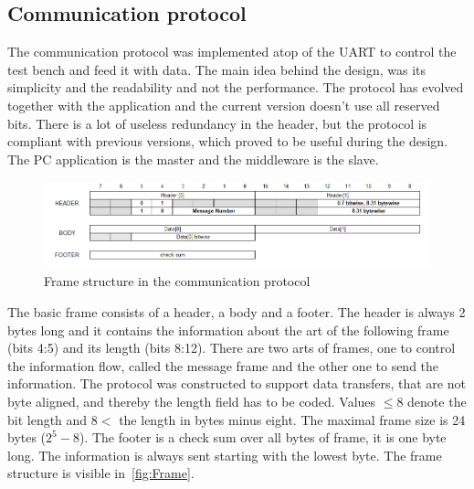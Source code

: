 \subsection{Communication protocol}
The communication protocol was implemented atop of the UART to control the test bench and feed it with data. The main idea behind the design, was its simplicity and the readability and not the performance. The protocol has evolved together with the application and the current version doesn't use all reserved bits. There is a lot of useless redundancy in the header, but the protocol is compliant with previous versions, which proved to be useful during the design. The PC application is the master and the middleware is the slave.

\begin{figure}[H]
\centering
\includegraphics[width=\textwidth]{figures/SerialFrame.png}
\caption{Frame structure in the communication protocol}
\label{fig:Frame}
\end{figure}

The basic frame consists of a header, a body and a footer. The header is always 2 bytes long and it contains the information about the art of the following frame (bits 4:5) and its length (bits 8:12). There are two arts of frames, one to control the information flow, called the message frame and the other one to send the information. The protocol was constructed to support data transfers, that are not byte aligned, and thereby the length field has to be coded. Values $\leq 8$ denote the bit length and $8 <$ the length in bytes minus eight. The maximal frame size is 24 bytes ($2^5 - 8$). The footer is a check sum over all bytes of frame, it is one byte long. The information is always sent starting with the lowest byte. The frame structure is visible in~\autoref{fig:Frame}.

